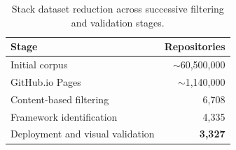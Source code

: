 \begin{table}[htbp]
\centering
\begin{tabular}{l r}
\hline
\textbf{Stage} & \textbf{Repositories} \\
\hline
Initial corpus & $\sim$60,500,000 \\
GitHub.io Pages & $\sim$1,140,000 \\
Content-based filtering & 6,708 \\
Framework identification & 4,335 \\
Deployment and visual validation & \textbf{3,327} \\
\hline
\end{tabular}
\caption{Stack dataset reduction across successive filtering and validation stages.}
\label{tab:stack_stats}
\end{table}





